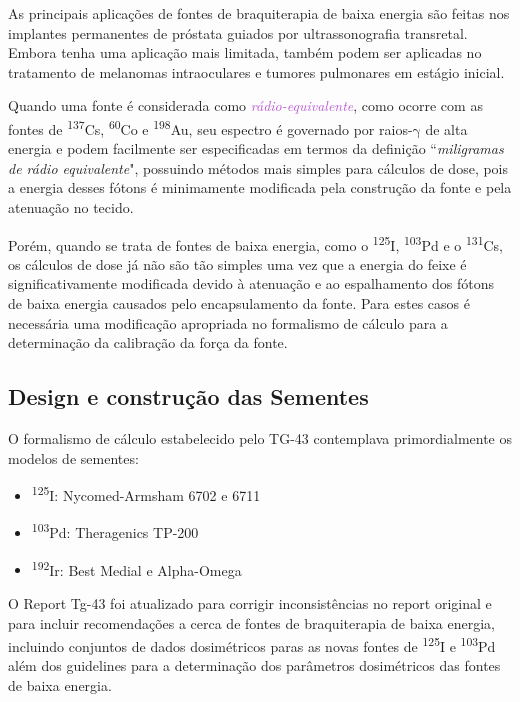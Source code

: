 \documentclass[11pt,a4paper]{article}
\begin{document}
		As principais aplicações de fontes de braquiterapia de baixa energia são feitas nos implantes permanentes de próstata guiados por ultrassonografia transretal. Embora tenha uma aplicação mais limitada, também podem ser aplicadas no tratamento de melanomas intraoculares e tumores pulmonares em estágio inicial.

		Quando uma fonte é considerada como \textit{\textcolor{MediumOrchid}{rádio-equivalente}}, como ocorre com as fontes de \textsuperscript{137}Cs, \textsuperscript{60}Co e \textsuperscript{198}Au, seu espectro é governado por raios-$\mathrm{\gamma}$ de alta energia e podem facilmente ser especificadas em termos da definição ``\textit{miligramas de rádio equivalente}", possuindo métodos mais simples para cálculos de dose, pois a energia desses fótons é minimamente modificada pela construção da fonte e pela atenuação no tecido. 

		Porém, quando se trata de fontes de baixa energia, como o \textsuperscript{125}I, \textsuperscript{103}Pd e o \textsuperscript{131}Cs, os cálculos de dose já não são tão simples uma vez que a energia do feixe é significativamente modificada devido à atenuação e ao espalhamento dos fótons de baixa energia causados pelo encapsulamento da fonte. Para estes casos é necessária uma modificação apropriada no formalismo de cálculo para a determinação da calibração da força da fonte.

\subsection*{Design e construção das Sementes}

			O formalismo de cálculo estabelecido pelo TG-43 contemplava primordialmente os modelos de sementes:

				\begin{itemize}
					\item \textsuperscript{125}I: Nycomed-Armsham 6702 e 6711
					\item \textsuperscript{103}Pd: Theragenics TP-200
					\item  \textsuperscript{192}Ir: Best Medial e Alpha-Omega
				\end{itemize}
			
			O Report Tg-43 foi atualizado para corrigir inconsistências no report original e para incluir recomendações a cerca de fontes de braquiterapia de baixa energia, incluindo conjuntos de dados dosimétricos paras as novas fontes de \textsuperscript{125}I e \textsuperscript{103}Pd além dos guidelines para a determinação dos parâmetros dosimétricos das fontes de baixa energia.
\end{document}
